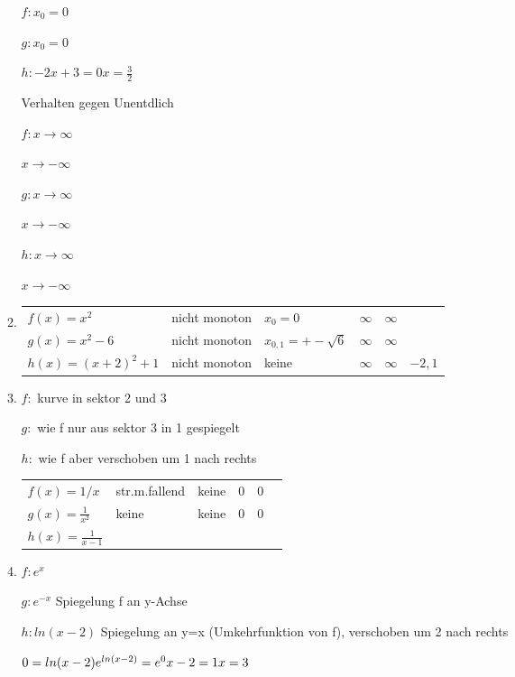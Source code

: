 \documentclass[12pt,a4paper]{scrreprt}
\begin{document}
\begin{enumerate}
\begin{enumerate}
$f: x_0=0$

$g: x_0=0$

$h: -2x+3=0 x= \frac{3}{2}$

Verhalten gegen Unentdlich

$f:	
x \rightarrow \infty$

$x \rightarrow -\infty$

$g:	
x \rightarrow \infty$

$x \rightarrow -\infty$


$h:	
x \rightarrow \infty$

$x \rightarrow -\infty$


\item

\begin{tabular}{llllll}

$f(x)=x^2$				& nicht monoton	& $x_0=0$				& $\infty$				&	$\infty$				& \\
$g(x)=x^2-6$			& nicht monoton	& $x_{0,1}=+-\sqrt{6}$	& $\infty$				&	$\infty$			& \\
$h(x)=(x+2)^2+1$		& nicht monoton	& keine					& $\infty$				&	$\infty$				&	$-2,1$
\end{tabular}

\item

$f:$	kurve in sektor 2 und 3

$g:$	wie f nur aus sektor 3 in 1 gespiegelt

$h:$	wie f aber verschoben um 1 nach rechts

\begin{tabular}{llllll}
$f(x) = 1/x$			&str.m.fallend	&keine				&$0$					&$0$	\\
$g(x) = \frac{1}{x^2}$	&keine			&keine				&$0$					&$0$	\\
$h(x) = \frac{1}{x-1}$	&
\end{tabular}

\item

$f:	e^x			$

$g:	e^{-x}		$ Spiegelung f an y-Achse

$h:	ln(x-2)		$ Spiegelung an y=x (Umkehrfunktion von f), verschoben um 2 nach rechts

$0 = ln(x-2) \\
 e^{ln(x-2)} = e^0 \\
 x-2 = 1 \\
 x = 3$


\end{enumerate}
\end{enumerate}
\end{document}
